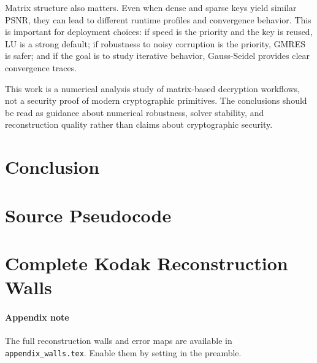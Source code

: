 \documentclass[11pt]{article}
\newif\ifincludeappendixwalls
\begin{document}
Matrix structure also matters. Even when dense and sparse keys yield similar PSNR, they can lead to different runtime profiles and convergence behavior. This is important for deployment choices: if speed is the priority and the key is reused, LU is a strong default; if robustness to noisy corruption is the priority, GMRES is safer; and if the goal is to study iterative behavior, Gauss-Seidel provides clear convergence traces.  

This work is a numerical analysis study of matrix-based decryption workflows, not a security proof of modern cryptographic primitives. The conclusions should be read as guidance about numerical robustness, solver stability, and reconstruction quality rather than claims about cryptographic security.

\section{Conclusion}

\clearpage

\appendix
\section{Source Pseudocode}



\section{Complete Kodak Reconstruction Walls}

\ifincludeappendixwalls

\else
\paragraph{Appendix note} The full reconstruction walls and error maps are available in \texttt{appendix\_walls.tex}. Enable them by setting \texttt{\string\includeappendixwallstrue} in the preamble.
\fi

\clearpage

\FloatBarrier
\end{document}

